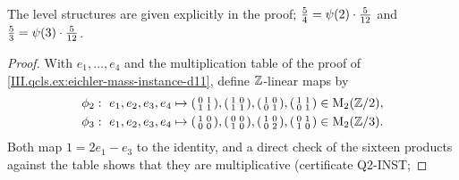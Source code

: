 \begin{example}[Eichler orders of levels $2$ and $3$ for $D=11$]
\end{example}
\noindent The level structures are given explicitly in the proof; $\frac54=\psi(2)\cdot\frac5{12}$ and $\frac53=\psi(3)\cdot\frac5{12}$.
\begin{proof}
With $e_1,\dots,e_4$ and the multiplication table of the proof of \cref{III.qcls.ex:eichler-mass-instance-d11}, define $\mathbb{Z}$-linear maps by
\begin{align*}
  \phi_2&:\ e_1,e_2,e_3,e_4\mapsto\begin{psmallmatrix}0&1\\1&1\end{psmallmatrix},\begin{psmallmatrix}1&0\\1&1\end{psmallmatrix},
  \begin{psmallmatrix}1&0\\0&1\end{psmallmatrix},\begin{psmallmatrix}1&1\\0&1\end{psmallmatrix}\in\Mat_2(\Z/2),\\
  \phi_3&:\ e_1,e_2,e_3,e_4\mapsto\begin{psmallmatrix}1&0\\0&0\end{psmallmatrix},\begin{psmallmatrix}0&0\\1&0\end{psmallmatrix},
  \begin{psmallmatrix}1&0\\0&2\end{psmallmatrix},\begin{psmallmatrix}0&1\\1&0\end{psmallmatrix}\in\Mat_2(\Z/3).
\end{align*}
Both map $1=2e_1-e_3$ to the identity, and a direct check of the sixteen products against the table shows that they are multiplicative (certificate Q2-INST;

\end{proof}
